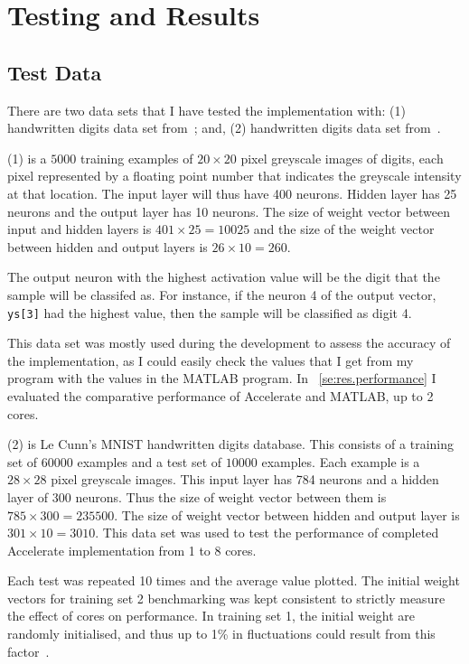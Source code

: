 \chapter{Testing and Results}\label{ch:results}

\section{Test Data}\label{se:res.testdata}
There are two data sets that I have tested the implementation with: (1) handwritten digits data set from~\cite{Ng12}; and, (2) handwritten digits data set from~\cite{LeCCorBur}.

(1) is a $5000$ training examples of $20 \times 20$ pixel greyscale images of digits, each pixel represented by a floating point number that indicates the greyscale intensity at that location. The input layer will thus have 400 neurons. Hidden layer has 25 neurons and the output layer has 10 neurons. The size of weight vector between input and hidden layers is $401 \times 25 = 10025$ and the size of the weight vector between hidden and output layers is $26 \times 10 = 260$. 

The output neuron with the highest activation value will be the digit that the sample will be classifed as. For instance, if the neuron 4 of the output vector, \texttt{ys[3]} had the highest value, then the sample will be classified as digit 4.

This data set was mostly used during the development to assess the accuracy of the implementation, as I could easily check the values that I get from my program with the values in the MATLAB program. In ~\ref{se:res.performance} I evaluated the comparative performance of Accelerate and MATLAB, up to 2 cores.

(2) is Le Cunn's MNIST handwritten digits database. This consists of a training set of $60000$ examples and a test set of $10000$ examples. Each example is a $28 \times 28$ pixel greyscale images. This input layer has 784 neurons and a hidden layer of 300 neurons. Thus the size of weight vector between them is $785 \times 300 = 235500$. The size of weight vector between hidden and output layer is $301 \times 10 = 3010$. This data set was used to test the performance of completed Accelerate implementation from 1 to 8 cores.

Each test was repeated 10 times and the average value plotted. The initial weight vectors for training set 2 benchmarking was kept consistent to strictly measure the effect of cores on performance. In training set 1, the initial weight are randomly initialised, and thus up to 1\% in fluctuations could result from this factor~\cite{Ng12}.
 
